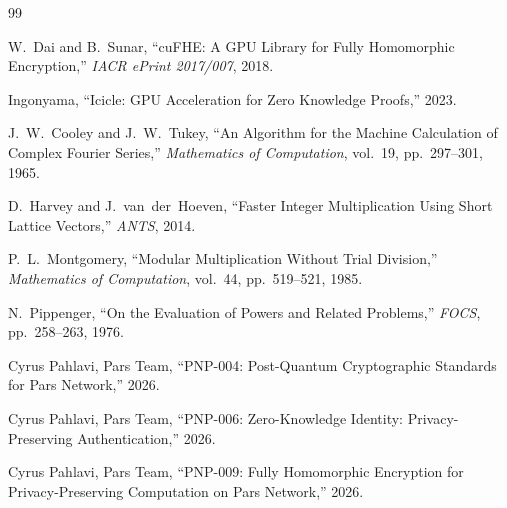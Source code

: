 \documentclass[11pt,a4paper]{article}
\begin{document}
\begin{thebibliography}{99}

W.~Dai and B.~Sunar,
``cuFHE: A GPU Library for Fully Homomorphic Encryption,''
\emph{IACR ePrint 2017/007}, 2018.

Ingonyama,
``Icicle: GPU Acceleration for Zero Knowledge Proofs,''
2023.

J.~W.~Cooley and J.~W.~Tukey,
``An Algorithm for the Machine Calculation of Complex Fourier Series,''
\emph{Mathematics of Computation}, vol.~19, pp.~297--301, 1965.

D.~Harvey and J.~van~der~Hoeven,
``Faster Integer Multiplication Using Short Lattice Vectors,''
\emph{ANTS}, 2014.

P.~L.~Montgomery,
``Modular Multiplication Without Trial Division,''
\emph{Mathematics of Computation}, vol.~44, pp.~519--521, 1985.

N.~Pippenger,
``On the Evaluation of Powers and Related Problems,''
\emph{FOCS}, pp.~258--263, 1976.

Cyrus Pahlavi, Pars Team,
``PNP-004: Post-Quantum Cryptographic Standards for Pars Network,''
2026.

Cyrus Pahlavi, Pars Team,
``PNP-006: Zero-Knowledge Identity: Privacy-Preserving Authentication,''
2026.

Cyrus Pahlavi, Pars Team,
``PNP-009: Fully Homomorphic Encryption for Privacy-Preserving
Computation on Pars Network,''
2026.

\end{thebibliography}
\end{document}
